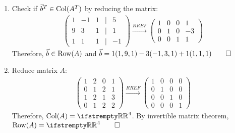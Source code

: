 \documentclass[12pt, a4paper]{article}
\begin{document}
\begin{enumerate}[Q\arabic*.]
\begin{enumerate}[(\alph*)]
      \item Check if $\vec{b}^T \in \operatorname{Col}(A^T)$ by reducing the matrix:
        \begin{align*}
          \left(\begin{array}{ccccc} 1 & -1 & 1 &|& 5\\ 9 & 3 & 1 &|& 1\\ 1 & 1 & 1 &|& -1 \end{array}\right)
          \xrightarrow{RREF}
          \left(\begin{array}{cccc} 1 & 0 & 0 & 1\\ 0 & 1 & 0 & -3\\ 0 & 0 & 1 & 1 \end{array}\right)
        \end{align*}
        Therefore, $\vec{b} \in \operatorname{Row}(A)$ and $\vec{b} = 1(1,9,1) -3(-1,3,1) +1(1,1,1) \qed$

      \item Reduce matrix $A$:
        \begin{align*}
          \left(\begin{array}{cccc} 1 & 2 & 0 & 1\\ 0 & 1 & 2 & 1\\ 1 & 2 & 1 & 3\\ 0 & 1 & 2 & 2 \end{array}\right)
          \xrightarrow{RREF}
          \left(\begin{array}{cccc} 1 & 0 & 0 & 0\\ 0 & 1 & 0 & 0\\ 0 & 0 & 1 & 0\\ 0 & 0 & 0 & 1 \end{array}\right)
        \end{align*}
        Therefore, $\col(A)=\RR^4$. By invertible matrix theorem, $\row(A)=\RR^4 \qed$
    \end{enumerate}


\end{enumerate}
\end{document}
